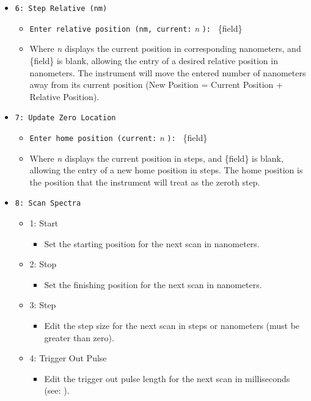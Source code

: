 \documentclass{article}
\begin{document}
\begin{itemize}
\begin{itemize}
    \end{itemize}
    \item \verb|6: Step Relative (nm)|
    \begin{itemize}
        \item \verb|Enter relative position (nm, current:| \emph{n} \verb|): | \{field\}
        \item Where \emph{n} displays the current position in corresponding nanometers, and \{field\} is blank, allowing the entry of a desired relative position in nanometers. The instrument will move the entered number of nanometers away from its current position (New Position = Current Position + Relative Position).
    \end{itemize}
    \item \verb|7: Update Zero Location|
    \begin{itemize}
        \item \verb|Enter home position (current:| \emph{n} \verb|): | \{field\}
        \item Where \emph{n} displays the current position in steps, and \{field\} is blank, allowing the entry of a new home position in steps. The home position is the position that the instrument will treat as the zeroth step.
    \end{itemize}
    \item \verb|8: Scan Spectra|
    \begin{itemize}
        \item 1: Start
        \begin{itemize}
            \item Set the starting position for the next scan in nanometers.
        \end{itemize}
        \item 2: Stop
        \begin{itemize}
            \item Set the finishing position for the next scan in nanometers.
        \end{itemize}
        \item 3: Step
        \begin{itemize}
            \item Edit the step size for the next scan in steps or nanometers (must be greater than zero).
        \end{itemize}
        \item 4: Trigger Out Pulse
        \begin{itemize}
            \item Edit the trigger out pulse length for the next scan in milliseconds (see: ).

\end{itemize}
\end{itemize}
\end{itemize}
\end{document}
